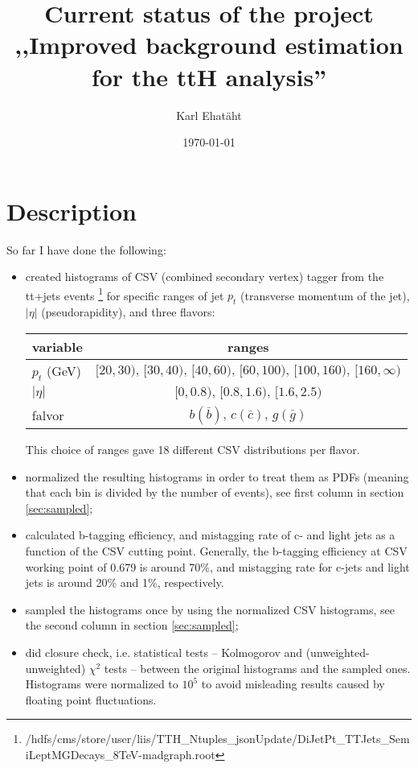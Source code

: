 \documentclass[12pt,a4paper]{article}
\title{\TitleFont\textbf{Current status of the project\\
,,Improved background estimation for the ttH analysis''}}
\author{Karl Ehatäht}
\date\today
\begin{document}
\maketitle

\section{Description}

So far I have done the following:
\begin{itemize}
\item created histograms of CSV (combined secondary vertex) tagger from the tt+jets events
\footnote{/hdfs/cms/store/user/liis/TTH\_Ntuples\_jsonUpdate/DiJetPt\_TTJets\_SemiLeptMGDecays\_8TeV-madgraph.root}
for specific ranges of jet $p_t$ (transverse momentum of the jet), $|\eta|$ (pseudorapidity), and three flavors:
\begin{center}
	\begin{tabular}{ l | c }
		\hline
		variable & ranges \\ \hline
		$p_t$ (GeV) & $[20,30),\,[30,40),\,[40,60),\,[60,100),\,[100,160),\,[160,\infty)$ \\ \hline
		$|\eta|$ & $[0,0.8),\,[0.8,1.6),\,[1.6,2.5)$ \\ \hline
		falvor & $b(\bar{b})$, $c(\bar{c})$, $g(\bar{g})$ \\
	\end{tabular}
\end{center}
This choice of ranges gave 18 different CSV distributions per flavor.
\item normalized the resulting histograms in order to treat them as PDFs (meaning that each bin is divided by the number of events), see first column in section \ref{sec:sampled};
\item calculated b-tagging efficiency, and mistagging rate of c- and light jets as a function of the CSV cutting point.
Generally, the b-tagging efficiency at CSV working point of 0.679 is around 70\%, and mistagging rate for c-jets and light jets is around 20\% and 1\%, respectively.
\item sampled the histograms once by using the normalized CSV histograms, see the second column in section \ref{sec:sampled};
\item did closure check, i.e. statistical tests -- Kolmogorov and (unweighted-unweighted) $\chi^2$ tests -- between the original histograms and the sampled ones.
Histograms were normalized to $10^5$ to avoid misleading results caused by floating point fluctuations.

\end{itemize}
\end{document}
